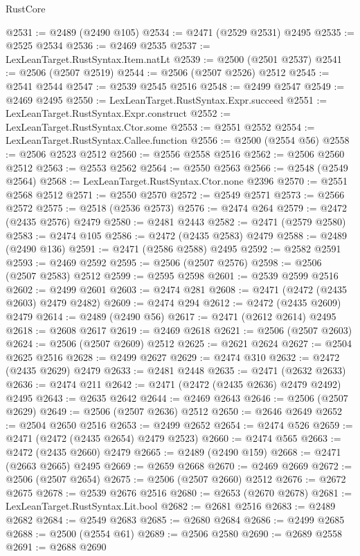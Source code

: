 \begin{lexlean}{RustCore}
\begin{coremodule}
@2531 := @2489 (@2490 @105)
@2534 := @2471 (@2529 @2531) @2495
@2535 := @2525 @2534
@2536 := @2469 @2535
@2537 := LexLeanTarget.RustSyntax.Item.natLt
@2539 := @2500 (@2501 @2537)
@2541 := @2506 (@2507 @2519)
@2544 := @2506 (@2507 @2526) @2512
@2545 := @2541 @2544
@2547 := @2539 @2545 @2516
@2548 := @2499 @2547
@2549 := @2469 @2495
@2550 := LexLeanTarget.RustSyntax.Expr.succeed
@2551 := LexLeanTarget.RustSyntax.Expr.construct
@2552 := LexLeanTarget.RustSyntax.Ctor.some
@2553 := @2551 @2552
@2554 := LexLeanTarget.RustSyntax.Callee.function
@2556 := @2500 (@2554 @56)
@2558 := @2506 @2523 @2512
@2560 := @2556 @2558 @2516
@2562 := @2506 @2560 @2512
@2563 := @2553 @2562
@2564 := @2550 @2563
@2566 := @2548 (@2549 @2564)
@2568 := LexLeanTarget.RustSyntax.Ctor.none @2396
@2570 := @2551 @2568 @2512
@2571 := @2550 @2570
@2572 := @2549 @2571
@2573 := @2566 @2572
@2575 := @2518 (@2536 @2573)
@2576 := @2474 @264
@2579 := @2472 (@2435 @2576) @2479
@2580 := @2481 @2443
@2582 := @2471 (@2579 @2580)
@2583 := @2474 @105
@2586 := @2472 (@2435 @2583) @2479
@2588 := @2489 (@2490 @136)
@2591 := @2471 (@2586 @2588) @2495
@2592 := @2582 @2591
@2593 := @2469 @2592
@2595 := @2506 (@2507 @2576)
@2598 := @2506 (@2507 @2583) @2512
@2599 := @2595 @2598
@2601 := @2539 @2599 @2516
@2602 := @2499 @2601
@2603 := @2474 @281
@2608 := @2471 (@2472 (@2435 @2603) @2479 @2482)
@2609 := @2474 @294
@2612 := @2472 (@2435 @2609) @2479
@2614 := @2489 (@2490 @56)
@2617 := @2471 (@2612 @2614) @2495
@2618 := @2608 @2617
@2619 := @2469 @2618
@2621 := @2506 (@2507 @2603)
@2624 := @2506 (@2507 @2609) @2512
@2625 := @2621 @2624
@2627 := @2504 @2625 @2516
@2628 := @2499 @2627
@2629 := @2474 @310
@2632 := @2472 (@2435 @2629) @2479
@2633 := @2481 @2448
@2635 := @2471 (@2632 @2633)
@2636 := @2474 @211
@2642 := @2471 (@2472 (@2435 @2636) @2479 @2492) @2495
@2643 := @2635 @2642
@2644 := @2469 @2643
@2646 := @2506 (@2507 @2629)
@2649 := @2506 (@2507 @2636) @2512
@2650 := @2646 @2649
@2652 := @2504 @2650 @2516
@2653 := @2499 @2652
@2654 := @2474 @526
@2659 := @2471 (@2472 (@2435 @2654) @2479 @2523)
@2660 := @2474 @565
@2663 := @2472 (@2435 @2660) @2479
@2665 := @2489 (@2490 @159)
@2668 := @2471 (@2663 @2665) @2495
@2669 := @2659 @2668
@2670 := @2469 @2669
@2672 := @2506 (@2507 @2654)
@2675 := @2506 (@2507 @2660) @2512
@2676 := @2672 @2675
@2678 := @2539 @2676 @2516
@2680 := @2653 (@2670 @2678)
@2681 := LexLeanTarget.RustSyntax.Lit.bool
@2682 := @2681 @2516
@2683 := @2489 @2682
@2684 := @2549 @2683
@2685 := @2680 @2684
@2686 := @2499 @2685
@2688 := @2500 (@2554 @61)
@2689 := @2506 @2580
@2690 := @2689 @2558
@2691 := @2688 @2690

\end{coremodule}
\end{lexlean}
